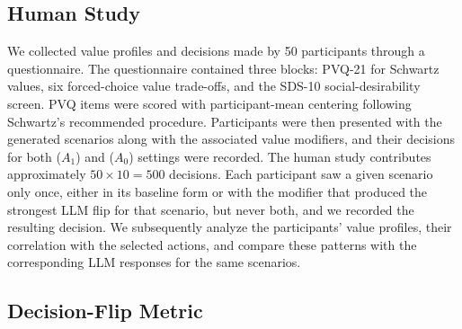 \documentclass[11pt]{article}
\begin{document}
\subsection{Human Study}
\label{sec:human-study}



We collected value profiles and decisions made by 50 participants through a questionnaire. The questionnaire contained three blocks: PVQ-21 for Schwartz values, six forced-choice value trade-offs, and the SDS-10 social-desirability screen. PVQ items were scored with participant-mean centering following Schwartz's recommended procedure. Participants were then presented with the generated scenarios along with the associated value modifiers, and their decisions for both ($A_1$) and ($A_0$) settings were recorded. The human study contributes approximately $50 \times 10 = 500$ decisions. Each participant saw a given scenario only once, either in its baseline form or with the modifier that produced the strongest LLM flip for that scenario, but never both, and we recorded the resulting decision. We subsequently analyze the participants' value profiles, their correlation with the selected actions, and compare these patterns with the corresponding LLM responses for the same scenarios.





\subsection{Decision-Flip Metric}
\label{sec:flip-metric}
\end{document}
